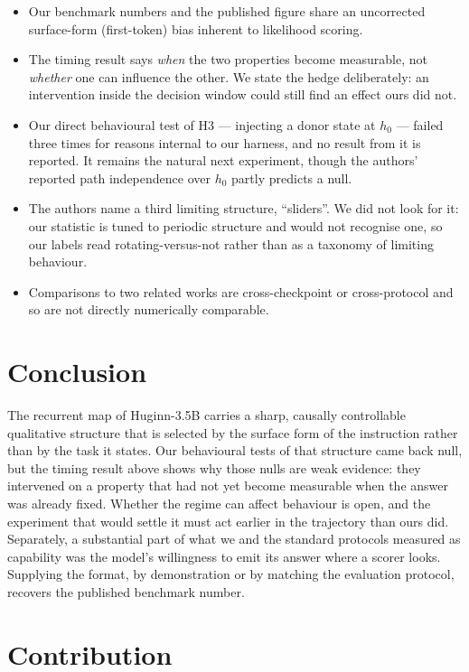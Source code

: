 \documentclass{zapiski}
\begin{document}
\begin{itemize}
\item Our benchmark numbers and the published figure share an uncorrected surface-form
(first-token) bias inherent to likelihood scoring.
\item The timing result says \emph{when} the two properties become measurable, not \emph{whether}
one can influence the other. We state the hedge deliberately: an intervention inside the decision
window could still find an effect ours did not.
\item Our direct behavioural test of H3 --- injecting a donor state at $h_0$ --- failed three
times for reasons internal to our harness, and no result from it is reported. It remains the
natural next experiment, though the authors' reported path independence over $h_0$ partly predicts
a null.
\item The authors name a third limiting structure, ``sliders''. We did not look for it: our
statistic is tuned to periodic structure and would not recognise one, so our labels read
rotating-versus-not rather than as a taxonomy of limiting behaviour.
\item Comparisons to two related works are cross-checkpoint or cross-protocol and so are not
directly numerically comparable.
\end{itemize}

\section{Conclusion}

The recurrent map of Huginn-3.5B carries a sharp, causally controllable qualitative structure that
is selected by the surface form of the instruction rather than by the task it states. Our
behavioural tests of that structure came back null, but the timing result above shows why those
nulls are weak evidence: they intervened on a property that had not yet become measurable when the
answer was already fixed. Whether the regime can affect behaviour is open, and the experiment that
would settle it must act earlier in the trajectory than ours did. Separately, a substantial part of
what we and the standard protocols measured as capability was the model's willingness to emit its
answer where a scorer looks. Supplying the format, by demonstration or by matching the evaluation
protocol, recovers the published benchmark number.

\section{Contribution}
\end{document}
